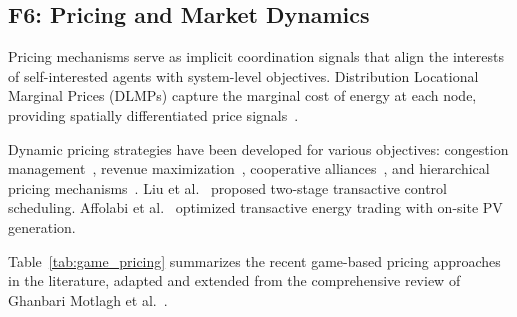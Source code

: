 \documentclass[review]{elsarticle}
\begin{document}
\subsection{F6: Pricing and Market Dynamics}\label{sec:f6}

\hspace{0.5cm}Pricing mechanisms serve as implicit coordination signals that align the interests of self-interested agents with system-level objectives. Distribution Locational Marginal Prices (DLMPs) capture the marginal cost of energy at each node, providing spatially differentiated price signals~\cite{wang2023dlmp,patnam2021dlmp}.

\hspace{0.5cm}Dynamic pricing strategies have been developed for various objectives: congestion management~\cite{kazemtarghi2024dynamic}, revenue maximization~\cite{ye2023identifying}, cooperative alliances~\cite{gao2024realtime}, and hierarchical pricing mechanisms~\cite{meng2024distributed}. Liu et al.~\cite{liu2019twostage} proposed two-stage transactive control scheduling. Affolabi et al.~\cite{affolabi2022optimal} optimized transactive energy trading with on-site PV generation.

\hspace{0.5cm}Table~\ref{tab:game_pricing} summarizes the recent game-based pricing approaches in the literature, adapted and extended from the comprehensive review of Ghanbari Motlagh et al.~\cite{motlagh2025applied}.
\end{document}

